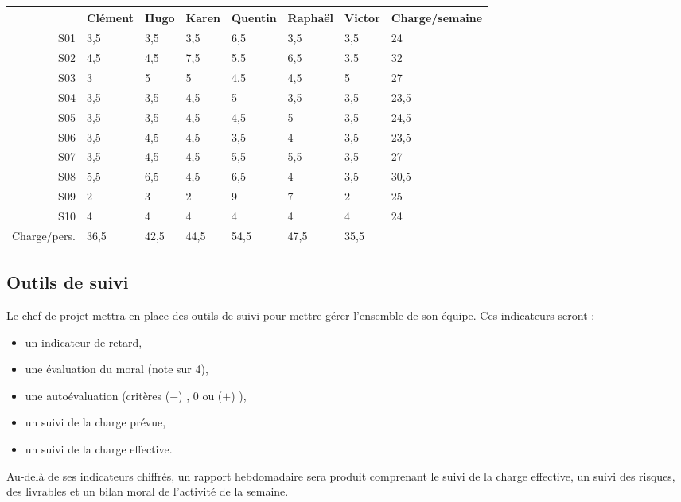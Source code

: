 \begin{longtable}{|r|l|l|l|l|l|l|l|}
\hline
&Clément&Hugo&Karen&Quentin&Raphaël&Victor&Charge/semaine\\
\endhead \hline
S01&3,5&3,5&3,5&6,5&3,5&3,5&24\\
\hline
S02&4,5&4,5&7,5&5,5&6,5&3,5&32\\
\hline
S03&3&5&5&4,5&4,5&5&27\\
\hline
S04&3,5&3,5&4,5&5&3,5&3,5&23,5\\
\hline
S05&3,5&3,5&4,5&4,5&5&3,5&24,5\\
\hline
S06&3,5&4,5&4,5&3,5&4&3,5&23,5\\
\hline
S07&3,5&4,5&4,5&5,5&5,5&3,5&27\\
\hline
S08&5,5&6,5&4,5&6,5&4&3,5&30,5\\
\hline
S09&2&3&2&9&7&2&25\\
\hline
S10&4&4&4&4&4&4&24\\
\hline
Charge/pers.&36,5&42,5&44,5&54,5&47,5&35,5&\\
\hline
\end{longtable}


\subsection{Outils de suivi}

Le chef de projet mettra en place des outils de suivi pour mettre
gérer l'ensemble de son équipe. 
Ces indicateurs seront : 
\begin{itemize}
\item un indicateur de retard,
\item une évaluation du moral (note sur 4),
\item une autoévaluation (critères ($-$) , 0 ou ($+$) ),
\item un suivi de la charge prévue,
\item un suivi de la charge effective.
\end{itemize}

Au-delà de ses indicateurs chiffrés, un rapport hebdomadaire sera produit
comprenant le suivi de la charge effective, un suivi des risques, des
livrables et un bilan moral de l'activité de la semaine.
